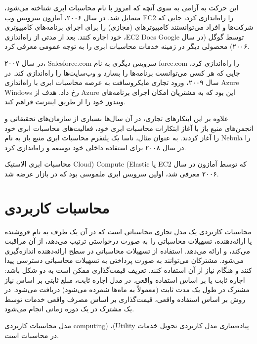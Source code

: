 \documentclass{book}
\begin{document}
            این حرکت به آرامی به سوی آنچه که امروز با نام محاسبات ابری شناخته می‌شود، متمایل شد. در سال ۲۰۰۶، آمازون سرویس وب EC2 را راه‌اندازی کرد، جایی که شرکت‌ها و افراد می‌توانستند کامپیوترهای (مجازی) را برای اجرای برنامه‌های کامپیوتری خود اجاره کنند. بعد از مدتی از راه‌اندازی ،EC2 Docs Google توسط گوگل (در سال ۲۰۰۶) محصولی دیگر در زمینه خدمات محاسبات ابری را به توجه عمومی معرفی کرد.

            در سال ۲۰۰۷، Salesforce.com سرویس دیگری به نام force.com را راه‌اندازی کرد، جایی که هر کسی می‌توانست برنامه‌ها را بسازد و وب‌سایت‌ها را راه‌اندازی کند. در سال ۲۰۰۹، ورود تجاری مایکروسافت به عرصه محاسبات ابری با راه‌اندازی Azure Windows رخ داد. هدف از Azure این بود که به مشتریان امکان اجرای برنامه‌های ویندوز خود را از طریق اینترنت فراهم کند.

            علاوه بر این ابتکارهای تجاری، در آن سال‌ها بسیاری از سازمان‌های تحقیقاتی و انجمن‌های منبع باز با آغاز ابتکارات محاسبات ابری خود، فعالیت‌های محاسبات ابری خود را آغاز کردند. به عنوان مثال، ناسا یک پلتفرم محاسبات ابری منبع باز به نام Nebula را در سال ۲۰۰۸ برای استفاده داخلی خود توسعه و راه‌اندازی کرد.

            \begin{addinfo}
                
                محاسبات ابری الاستیک Cloud) Compute (Elastic یا EC2 که توسط آمازون در سال ۲۰۰۶ معرفی شد، اولین سرویس ابری ملموسی بود که در بازار عرضه شد.

            \end{addinfo}

        \section{محاسبات کاربردی}

            محاسبات کاربردی یک مدل تجاری محاسباتی است که در آن یک طرف به نام فروشنده یا ارائه‌دهنده، تسهیلات محاسباتی را به صورت درخواستی ترتیب می‌دهد، از آن مراقبت می‌کند، و ارائه می‌دهد. استفاده از تسهیلات محاسباتی در سطح ارائه‌دهنده اندازه‌گیری می‌شود. مشترکان می‌توانند به صورت پرداختی به تسهیلات محاسباتی دسترسی پیدا کنند و هنگام نیاز از آن استفاده کنند. تعریف قیمت‌گذاری ممکن است به دو شکل باشد: اجاره ثابت یا بر اساس استفاده واقعی. در مدل اجاره ثابت، مبلغ ثابتی بر اساس نیاز مشترک در طول یک مدت ثابت (معمولاً به ماه‌ها شمرده می‌شود) دریافت می‌شود. در روش بر اساس استفاده واقعی، قیمت‌گذاری بر اساس مصرف واقعی خدمات توسط یک مشترک در یک دوره زمانی انجام می‌شود.

            \begin{addinfo}
                
                مدل محاسبات کاربردی computing) ،(Utility پیاده‌سازی مدل کاربردی تحویل خدمات در محاسبات است.

            \end{addinfo}
\end{document}
